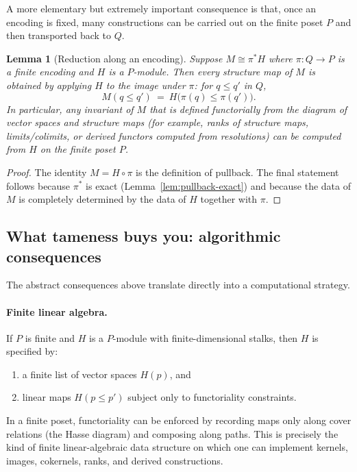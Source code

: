 \documentclass{article}
\newcommand{\<}{\langle}
\renewcommand{\>}{\rangle}
\newtheorem{lemma}[theorem]{Lemma}
\theoremstyle{definition}
\theoremstyle{remark}
\begin{document}
	A more elementary but extremely important consequence is that, once an encoding is fixed,
	many constructions can be carried out on the finite poset $P$ and then transported back
	to $Q$.
	
	\begin{lemma}[Reduction along an encoding]
		\label{lem:reduction-along-encoding}
		Suppose $M\cong \pi^*H$ where $\pi\colon Q\to P$ is a finite encoding and $H$ is a
		$P$-module.
		Then every structure map of $M$ is obtained by applying $H$ to the image under $\pi$:
		for $q\le q'$ in $Q$,
		\[
		M(q\le q') \ = \ H\!\big(\pi(q)\le \pi(q')\big).
		\]
		In particular, any invariant of $M$ that is defined functorially from the diagram of
		vector spaces and structure maps (for example, ranks of structure maps, limits/colimits,
		or derived functors computed from resolutions) can be computed from $H$ on the finite
		poset $P$.
	\end{lemma}
	
	\begin{proof}
		The identity $M=H\circ\pi$ is the definition of pullback.  The final statement follows
		because $\pi^*$ is exact (Lemma~\ref{lem:pullback-exact}) and because the data of $M$
		is completely determined by the data of $H$ together with $\pi$.
	\end{proof}
	
	\subsection{What tameness buys you: algorithmic consequences}
	\label{subsec:tame-algo}
	
	The abstract consequences above translate directly into a computational strategy.
	
	\paragraph{Finite linear algebra.}
	If $P$ is finite and $H$ is a $P$-module with finite-dimensional stalks, then $H$ is
	specified by:
	\begin{enumerate}[label=(\roman*)]
		\item a finite list of vector spaces $H(p)$, and
		\item linear maps $H(p\le p')$ subject only to functoriality constraints.
	\end{enumerate}
	In a finite poset, functoriality can be enforced by recording maps only along cover
	relations (the Hasse diagram) and composing along paths.  This is precisely the kind of
	finite linear-algebraic data structure on which one can implement kernels, images,
	cokernels, ranks, and derived constructions.
	
\end{document}
